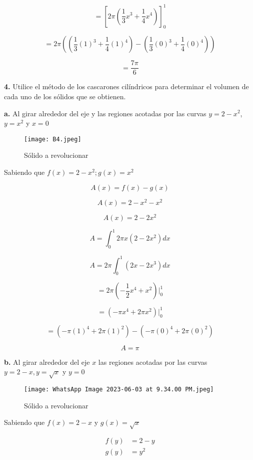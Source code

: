 \documentclass[12pt]{article}
\begin{document}
\begin{flushleft}
$$=\left[2\pi\left ( \frac{1}{3}x^{3}+\frac{1}{4} x^{4}\right )\right]_{0}^{1}$$

$$=2\pi\left(\left ( \frac{1}{3}\left ( 1 \right )^{3}+\frac{1}{4} \left (1 \right )^{4}\right )-\left ( \frac{1}{3}\left ( 0\right )^{3}+\frac{1}{4} \left (0 \right )^{4}\right )\right)$$


$$=\frac{7\pi}{6}$$


\newpage

\textbf{4.}  Utilice el método de los cascarones cilíndricos para determinar el volumen de cada uno de los sólidos que se obtienen.

\textbf{a. }Al girar alrededor del eje y las regiones acotadas por las curvas $y=2-x^{2}$, $y=x^{2}$ y $x=0$


\begin{figure}[H]
    \centering
    \texttt{[image: B4.jpeg]}
    \caption{Sólido a revolucionar}
    \label{Solido a revolucionar}
\end{figure}


Sabiendo que $f(x)=2-x^{2};g(x)=x^{2}$


$$A(x) = f(x)-g(x)$$


$$A(x) =2-x^{2}-x^{2}$$


$$A(x) =2-2x^{2}$$


$$A=\int_{0}^{1}2\pi x(2-2x^{2})dx$$


$$A=2\pi\int_{0}^{1} (2x-2x^{3})dx$$


$$=2\pi\left ( -\frac{1}{2}x^{4}+x^{2}\right )|_{0}^{1}$$


$$=\left ( -\pi x^{4}+2\pi x^{2}\right )|_{0}^{1}$$


$$=\left ( -\pi \left ( 1 \right )^{4}+2\pi \left ( 1 \right )^{2} \right ) - \left ( -\pi \left ( 0 \right )^{4}+2\pi \left ( 0 \right )^{2} \right )$$


$$A=\pi$$


\textbf{b.} Al girar alrededor del eje $x$ las regiones acotadas por las curvas $y=2-x, y=\sqrt{x}$ y $y=0$

\begin{figure}[H]
    \centering
    \texttt{[image: WhatsApp Image 2023-06-03 at 9.34.00 PM.jpeg]}
    \caption{Sólido a revolucionar}
    \label{fig:enter-label}
\end{figure}

Sabiendo que $f(x)=2-x$ y $g(x)=\sqrt{x}$

\begin{align*}
f(y)&=2-y\\
g(y)&=y^{2}\\   
\end{align*}


\end{flushleft}
\end{document}

